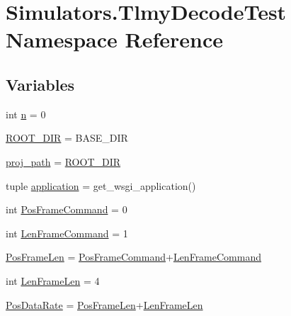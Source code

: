 \hypertarget{namespace_simulators_1_1_tlmy_decode_test}{}\section{Simulators.\+Tlmy\+Decode\+Test Namespace Reference}
\label{namespace_simulators_1_1_tlmy_decode_test}
\subsection*{Variables}
\begin{DoxyCompactItemize}
\item 
int \hyperlink{namespace_simulators_1_1_tlmy_decode_test_ad836a39f9bcd20345b56d01f58eecaf1}{n} = 0
\item 
\hyperlink{namespace_simulators_1_1_tlmy_decode_test_a0bc4eab667a3ff94238a2d8187797dc5}{R\+O\+O\+T\+\_\+\+D\+I\+R} = B\+A\+S\+E\+\_\+\+D\+I\+R
\item 
\hyperlink{namespace_simulators_1_1_tlmy_decode_test_a4313ff4769b13f6edb1bcf7104f71022}{proj\+\_\+path} = \hyperlink{namespace_simulators_1_1_tlmy_decode_test_a0bc4eab667a3ff94238a2d8187797dc5}{R\+O\+O\+T\+\_\+\+D\+I\+R}
\item 
tuple \hyperlink{namespace_simulators_1_1_tlmy_decode_test_a51f14e6b84a52552161b97798ed7a930}{application} = get\+\_\+wsgi\+\_\+application()
\item 
int \hyperlink{namespace_simulators_1_1_tlmy_decode_test_ae6bd3c16c47704c1b06682176682dbe2}{Pos\+Frame\+Command} = 0
\item 
int \hyperlink{namespace_simulators_1_1_tlmy_decode_test_a77da7f775045ecca5d656005d554f152}{Len\+Frame\+Command} = 1
\item 
\hyperlink{namespace_simulators_1_1_tlmy_decode_test_a73e42869ff64bec4ebd7b1df0559972b}{Pos\+Frame\+Len} = \hyperlink{namespace_simulators_1_1_tlmy_decode_test_ae6bd3c16c47704c1b06682176682dbe2}{Pos\+Frame\+Command}+\hyperlink{namespace_simulators_1_1_tlmy_decode_test_a77da7f775045ecca5d656005d554f152}{Len\+Frame\+Command}
\item 
int \hyperlink{namespace_simulators_1_1_tlmy_decode_test_aa6ecc7c034ba7d263536e7029bc3a102}{Len\+Frame\+Len} = 4
\item 
\hyperlink{namespace_simulators_1_1_tlmy_decode_test_af8aa110404c9f747ad0f9cac7b852c75}{Pos\+Data\+Rate} = \hyperlink{namespace_simulators_1_1_tlmy_decode_test_a73e42869ff64bec4ebd7b1df0559972b}{Pos\+Frame\+Len}+\hyperlink{namespace_simulators_1_1_tlmy_decode_test_aa6ecc7c034ba7d263536e7029bc3a102}{Len\+Frame\+Len}

\end{DoxyCompactItemize}
